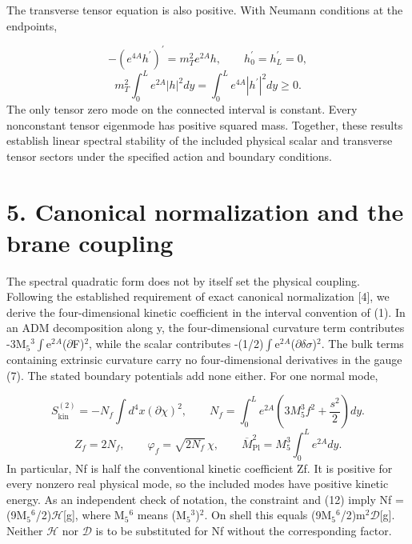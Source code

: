 \documentclass[11pt]{article}
\begin{document}
The transverse tensor equation is also positive. With Neumann conditions at the endpoints,

\begin{equation}
-(e^{4A}h^\prime)^\prime=m_T^2e^{2A}h,\qquad h_0^\prime=h_L^\prime=0,\tag{16}
\end{equation}
\begin{equation}
m_T^2\int_0^Le^{2A}|h|^2dy=\int_0^Le^{4A}|h^\prime|^2dy\geq0.\tag{17}
\end{equation}
The only tensor zero mode on the connected interval is constant. Every nonconstant tensor eigenmode has positive squared mass. Together, these results establish linear spectral stability of the included physical scalar and transverse tensor sectors under the specified action and boundary conditions.

\section*{5. Canonical normalization and the brane coupling}
The spectral quadratic form does not by itself set the physical coupling. Following the established requirement of exact canonical normalization [4], we derive the four-dimensional kinetic coefficient in the interval convention of (1). In an ADM decomposition along y, the four-dimensional curvature term contributes -3M\({}_5\)\({}^3\)\(\int\)e\({}^2\)\({}^A\)(\(\partial\)F)\({}^2\), while the scalar contributes -(1/2)\(\int\)e\({}^2\)\({}^A\)(\(\partial\)\(\delta\)\(\sigma\))\({}^2\). The bulk terms containing extrinsic curvature carry no four-dimensional derivatives in the gauge (7). The stated boundary potentials add none either. For one normal mode,

\begin{equation}
S_{\mathrm{kin}}^{(2)}=-N_f\int d^4x(\partial\chi)^2,\qquad N_f=\int_0^Le^{2A}\left(3M_5^3f^2+\frac{s^2}{2}\right)dy.\tag{18}
\end{equation}
\begin{equation}
Z_f=2N_f,\qquad \varphi_f=\sqrt{2N_f}\,\chi,\qquad \overline{M}_{\mathrm{Pl}}^2=M_5^3\int_0^Le^{2A}dy.\tag{19}
\end{equation}
In particular, Nf is half the conventional kinetic coefficient Zf. It is positive for every nonzero real physical mode, so the included modes have positive kinetic energy. As an independent check of notation, the constraint and (12) imply Nf = (9M\({}_5\)\({}^6\)/2)\(\mathcal H\)[g], where M\({}_5\)\({}^6\) means (M\({}_5\)\({}^3\))\({}^2\). On shell this equals (9M\({}_5\)\({}^6\)/2)m\({}^2\)\(\mathcal D\)[g]. Neither \(\mathcal H\) nor \(\mathcal D\) is to be substituted for Nf without the corresponding factor.
\end{document}
